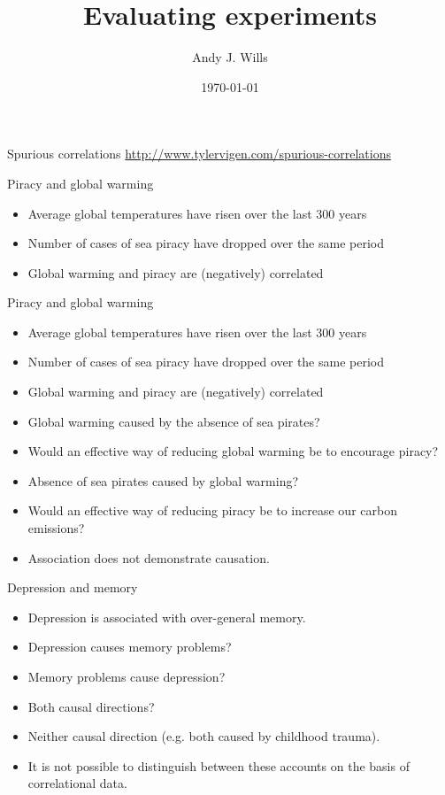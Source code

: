 \documentclass{beamer}
\title[Critical Thinking]{Evaluating experiments}
\author{Andy J. Wills}
\date{\today}
\begin{document}
\frame{\titlepage}

\begin{frame}{Spurious correlations}
	\url{http://www.tylervigen.com/spurious-correlations}
\end{frame}


\begin{frame}{Piracy and global warming}
\begin{itemize}
\item Average global temperatures have risen over the last 300 years
\item Number of cases of sea piracy have dropped over the same period
\item Global warming and piracy are (negatively) correlated
\vspace{12 pt}
\end{itemize}
\end{frame}



\begin{frame}{Piracy and global warming}
\begin{itemize}
\item Average global temperatures have risen over the last 300 years
\item Number of cases of sea piracy have dropped over the same period
\item Global warming and piracy are (negatively) correlated
\vspace{12 pt}
\item Global warming caused by the absence of sea pirates? 
\item Would an effective way of reducing global warming be to encourage piracy?
\vspace{12 pt}
\item Absence of sea pirates caused by global warming? 
\item Would an effective way of reducing piracy be to increase our carbon emissions?
\vspace{12 pt}
\item Association does not demonstrate causation. 
\end{itemize}
\end{frame}



\begin{frame}{Depression and memory}
\begin{itemize}
\item Depression is associated with over-general memory.
\vspace{12 pt}
\item Depression causes memory problems? 
\item Memory problems cause depression?
\item Both causal directions?
\item Neither causal direction (e.g. both caused by childhood trauma). 
\vspace{12 pt}
\item It is not possible to distinguish between these accounts on the basis of correlational data.
\end{itemize}
\end{frame}
\end{document}
